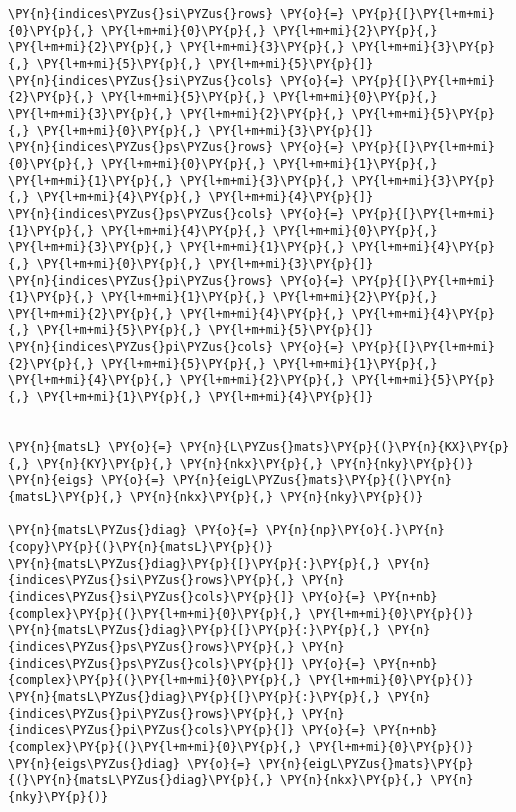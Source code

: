 \begin{Verbatim}[commandchars=\\\{\}]
\PY{n}{indices\PYZus{}si\PYZus{}rows} \PY{o}{=} \PY{p}{[}\PY{l+m+mi}{0}\PY{p}{,} \PY{l+m+mi}{0}\PY{p}{,} \PY{l+m+mi}{2}\PY{p}{,} \PY{l+m+mi}{2}\PY{p}{,} \PY{l+m+mi}{3}\PY{p}{,} \PY{l+m+mi}{3}\PY{p}{,} \PY{l+m+mi}{5}\PY{p}{,} \PY{l+m+mi}{5}\PY{p}{]}
\PY{n}{indices\PYZus{}si\PYZus{}cols} \PY{o}{=} \PY{p}{[}\PY{l+m+mi}{2}\PY{p}{,} \PY{l+m+mi}{5}\PY{p}{,} \PY{l+m+mi}{0}\PY{p}{,} \PY{l+m+mi}{3}\PY{p}{,} \PY{l+m+mi}{2}\PY{p}{,} \PY{l+m+mi}{5}\PY{p}{,} \PY{l+m+mi}{0}\PY{p}{,} \PY{l+m+mi}{3}\PY{p}{]}
\PY{n}{indices\PYZus{}ps\PYZus{}rows} \PY{o}{=} \PY{p}{[}\PY{l+m+mi}{0}\PY{p}{,} \PY{l+m+mi}{0}\PY{p}{,} \PY{l+m+mi}{1}\PY{p}{,} \PY{l+m+mi}{1}\PY{p}{,} \PY{l+m+mi}{3}\PY{p}{,} \PY{l+m+mi}{3}\PY{p}{,} \PY{l+m+mi}{4}\PY{p}{,} \PY{l+m+mi}{4}\PY{p}{]}
\PY{n}{indices\PYZus{}ps\PYZus{}cols} \PY{o}{=} \PY{p}{[}\PY{l+m+mi}{1}\PY{p}{,} \PY{l+m+mi}{4}\PY{p}{,} \PY{l+m+mi}{0}\PY{p}{,} \PY{l+m+mi}{3}\PY{p}{,} \PY{l+m+mi}{1}\PY{p}{,} \PY{l+m+mi}{4}\PY{p}{,} \PY{l+m+mi}{0}\PY{p}{,} \PY{l+m+mi}{3}\PY{p}{]}
\PY{n}{indices\PYZus{}pi\PYZus{}rows} \PY{o}{=} \PY{p}{[}\PY{l+m+mi}{1}\PY{p}{,} \PY{l+m+mi}{1}\PY{p}{,} \PY{l+m+mi}{2}\PY{p}{,} \PY{l+m+mi}{2}\PY{p}{,} \PY{l+m+mi}{4}\PY{p}{,} \PY{l+m+mi}{4}\PY{p}{,} \PY{l+m+mi}{5}\PY{p}{,} \PY{l+m+mi}{5}\PY{p}{]}
\PY{n}{indices\PYZus{}pi\PYZus{}cols} \PY{o}{=} \PY{p}{[}\PY{l+m+mi}{2}\PY{p}{,} \PY{l+m+mi}{5}\PY{p}{,} \PY{l+m+mi}{1}\PY{p}{,} \PY{l+m+mi}{4}\PY{p}{,} \PY{l+m+mi}{2}\PY{p}{,} \PY{l+m+mi}{5}\PY{p}{,} \PY{l+m+mi}{1}\PY{p}{,} \PY{l+m+mi}{4}\PY{p}{]}


\PY{n}{matsL} \PY{o}{=} \PY{n}{L\PYZus{}mats}\PY{p}{(}\PY{n}{KX}\PY{p}{,} \PY{n}{KY}\PY{p}{,} \PY{n}{nkx}\PY{p}{,} \PY{n}{nky}\PY{p}{)}
\PY{n}{eigs} \PY{o}{=} \PY{n}{eigL\PYZus{}mats}\PY{p}{(}\PY{n}{matsL}\PY{p}{,} \PY{n}{nkx}\PY{p}{,} \PY{n}{nky}\PY{p}{)}

\PY{n}{matsL\PYZus{}diag} \PY{o}{=} \PY{n}{np}\PY{o}{.}\PY{n}{copy}\PY{p}{(}\PY{n}{matsL}\PY{p}{)}
\PY{n}{matsL\PYZus{}diag}\PY{p}{[}\PY{p}{:}\PY{p}{,} \PY{n}{indices\PYZus{}si\PYZus{}rows}\PY{p}{,} \PY{n}{indices\PYZus{}si\PYZus{}cols}\PY{p}{]} \PY{o}{=} \PY{n+nb}{complex}\PY{p}{(}\PY{l+m+mi}{0}\PY{p}{,} \PY{l+m+mi}{0}\PY{p}{)}
\PY{n}{matsL\PYZus{}diag}\PY{p}{[}\PY{p}{:}\PY{p}{,} \PY{n}{indices\PYZus{}ps\PYZus{}rows}\PY{p}{,} \PY{n}{indices\PYZus{}ps\PYZus{}cols}\PY{p}{]} \PY{o}{=} \PY{n+nb}{complex}\PY{p}{(}\PY{l+m+mi}{0}\PY{p}{,} \PY{l+m+mi}{0}\PY{p}{)}
\PY{n}{matsL\PYZus{}diag}\PY{p}{[}\PY{p}{:}\PY{p}{,} \PY{n}{indices\PYZus{}pi\PYZus{}rows}\PY{p}{,} \PY{n}{indices\PYZus{}pi\PYZus{}cols}\PY{p}{]} \PY{o}{=} \PY{n+nb}{complex}\PY{p}{(}\PY{l+m+mi}{0}\PY{p}{,} \PY{l+m+mi}{0}\PY{p}{)}
\PY{n}{eigs\PYZus{}diag} \PY{o}{=} \PY{n}{eigL\PYZus{}mats}\PY{p}{(}\PY{n}{matsL\PYZus{}diag}\PY{p}{,} \PY{n}{nkx}\PY{p}{,} \PY{n}{nky}\PY{p}{)}



\end{Verbatim}
